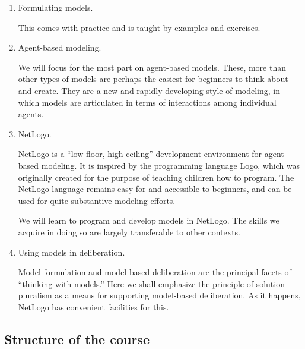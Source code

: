 \begin{enumerate}
\item Formulating models.

This comes with practice and is taught by examples and exercises.

\item Agent-based modeling.

We will focus for the most part on agent-based models. These, more than other types of models are perhaps the easiest for beginners to think about and create. They are a new and rapidly developing style of modeling, in which models are articulated in terms of interactions among individual agents. 

\item NetLogo.

NetLogo is a ``low floor, high ceiling'' development environment for agent-based modeling. It is inspired by the programming language Logo, which was originally created for the purpose of teaching children how to program. The NetLogo language remains easy for and accessible to beginners, and can be used for quite substantive modeling efforts. 

We will learn to program and develop models in NetLogo. The skills we acquire in doing so are largely transferable to other contexts.

\item Using models in deliberation.

Model formulation and model-based deliberation are the principal facets of ``thinking with models.'' Here we shall emphasize the principle of solution pluralism as a means for supporting model-based deliberation. As it happens, NetLogo has convenient facilities for this.

\end{enumerate}

\subsection{Structure of the course}


